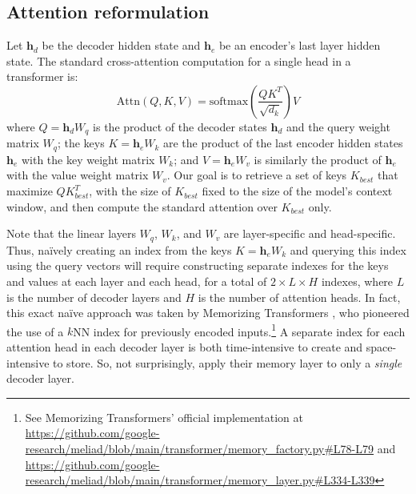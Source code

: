 \documentclass{article}
\def\vh{{\bm{h}}}
\begin{document}
\subsection{Attention reformulation}
\label{subsec:attentiontrick}

Let $\vh_d$ be the decoder hidden state and $\vh_e$ be an encoder's last layer hidden state. 
The standard cross-attention computation for a single head in a transformer is:
\begin{equation}
   \mathrm{Attn}(Q, K, V) = \mathrm{softmax}\left(\frac{QK^T}{\sqrt{d_k}}\right)V
\end{equation}
where $Q={\vh_d}W_q$ is the product of the decoder states $\vh_d$ and the query weight matrix $W_q$; 
the keys $K = {\vh_e}W_k$ are the product of the last encoder hidden states $\vh_e$ with the key weight matrix $W_k$; 
and $V={\vh_e}W_v$ is similarly the product of $\vh_e$ with the value weight matrix $W_v$. 
Our goal is to retrieve a set of keys $K_{best}$ that maximize $QK_{best}^T$, with the size of $K_{best}$ fixed to the size of the model's context window, and then compute the standard attention over $K_{best}$ only.

Note that the linear layers $W_q$, $W_k$, and $W_v$ are layer-specific and head-specific. Thus, na\"ively creating an index from the keys $K = {\vh_e}W_k$ and querying this index using the query vectors will require 
constructing separate indexes for the keys and values at each layer and each head, for a total of $2\times L \times H$ indexes, where $L$ is the number of decoder layers and $H$ is the number of attention heads.
In fact, this exact na\"ive approach was taken by Memorizing Transformers \citep{memtrans}, who pioneered the use of a $k$NN index for previously encoded inputs.\footnote{See Memorizing Transformers' official implementation at \url{https://github.com/google-research/meliad/blob/main/transformer/memory\_factory.py\#L78-L79} and \url{https://github.com/google-research/meliad/blob/main/transformer/memory\_layer.py\#L334-L339}} 
A separate index for each attention head in each decoder layer is both time-intensive to create and space-intensive to store. 
So, not surprisingly, \citet{memtrans} apply their memory layer to only a \emph{single} decoder layer.
\end{document}
